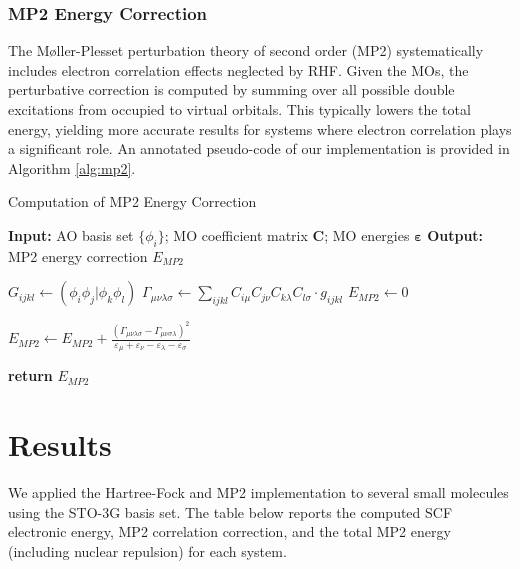\documentclass[12pt]{article}
\begin{document}
\subsubsection*{MP2 Energy Correction}

The Møller-Plesset perturbation theory of second order (MP2) systematically includes electron correlation effects neglected by RHF. Given the MOs, the perturbative correction is computed by summing over all possible double excitations from occupied to virtual orbitals. This typically lowers the total energy, yielding more accurate results for systems where electron correlation plays a significant role. An annotated pseudo-code of our implementation is provided in Algorithm \ref{alg:mp2}. 

\begin{algorithm}[H]
    \caption{Computation of MP2 Energy Correction}
    \begin{algorithmic}[1]
        \Statex \textbf{Input:} AO basis set $\{\phi_i\}$; MO coefficient matrix $\mathbf{C}$; MO energies $\boldsymbol{\varepsilon}$
        \Statex \textbf{Output:} MP2 energy correction $E_{MP2}$

        \State $G_{ijkl} \gets (\phi_i \phi_j | \phi_k \phi_l)$ 
        \State $\Gamma_{\mu \nu \lambda \sigma} \gets \sum_{ijkl} C_{i \mu} C_{j \nu} C_{k \lambda} C_{l \sigma} \cdot g_{ijkl}$ 
        \State $E_{MP2} \gets 0$ 

                \State $E_{MP2} \gets E_{MP2} + \frac{(\Gamma_{\mu \nu \lambda \sigma} - \Gamma_{\mu \nu \sigma \lambda})^2}{\varepsilon_\mu + \varepsilon_\nu - \varepsilon_\lambda - \varepsilon_\sigma}$ 
            \EndFor
        \EndFor

        \State \textbf{return} $E_{MP2}$
    \end{algorithmic}
    \label{alg:mp2}
\end{algorithm}


\section{Results}

We applied the Hartree-Fock and MP2 implementation to several small molecules using the STO-3G basis set. The table below reports the computed SCF electronic energy, MP2 correlation correction, and the total MP2 energy (including nuclear repulsion) for each system.
\end{document}
